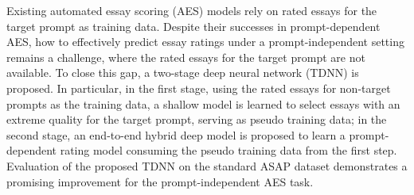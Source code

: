 Existing automated essay scoring (AES) models rely on rated essays for the target prompt as training data. Despite their successes in prompt-dependent AES, how to effectively predict essay ratings under a prompt-independent setting remains a challenge, where the rated essays for the target prompt are not available. To close this gap, a two-stage deep neural network (TDNN) is proposed. In particular, in the first stage, using the rated essays for non-target prompts as the training data, a shallow model is learned to select essays with an extreme quality for the target prompt, serving as pseudo training data; in the second stage, an end-to-end hybrid deep model is proposed to learn a prompt-dependent rating model consuming the pseudo training data from the first step. Evaluation of the proposed TDNN on the standard ASAP dataset demonstrates a promising improvement for the prompt-independent AES task.
